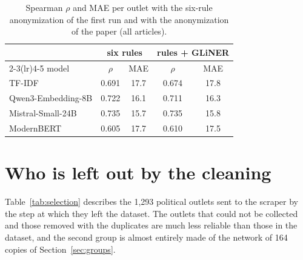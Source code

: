 \documentclass[11pt,a4paper]{article}
\begin{document}
\begin{table}[h]
\centering
\caption{Spearman $\rho$ and MAE per outlet with the six-rule anonymization of the first run and with the
anonymization of the paper (all articles).}\label{tab:anon}
\begin{tabular}{lcccc}
\toprule
& \multicolumn{2}{c}{six rules} & \multicolumn{2}{c}{rules + GLiNER} \\
\cmidrule(lr){2-3}\cmidrule(lr){4-5}
model & $\rho$ & MAE & $\rho$ & MAE \\
\midrule
TF-IDF & 0.691 & 17.7 & 0.674 & 17.8 \\
Qwen3-Embedding-8B & 0.722 & 16.1 & 0.711 & 16.3 \\
Mistral-Small-24B & 0.735 & 15.7 & 0.735 & 15.8 \\
ModernBERT & 0.605 & 17.7 & 0.610 & 17.5 \\
\bottomrule
\end{tabular}
\end{table}

\section{Who is left out by the cleaning}\label{app:selection}
Table~\ref{tab:selection} describes the 1,293 political outlets sent to the scraper by the step at which they left the
dataset. The outlets that could not be collected and those removed with the duplicates are much less reliable than
those in the dataset, and the second group is almost entirely made of the network of 164 copies of
Section~\ref{sec:groups}.
\end{document}

